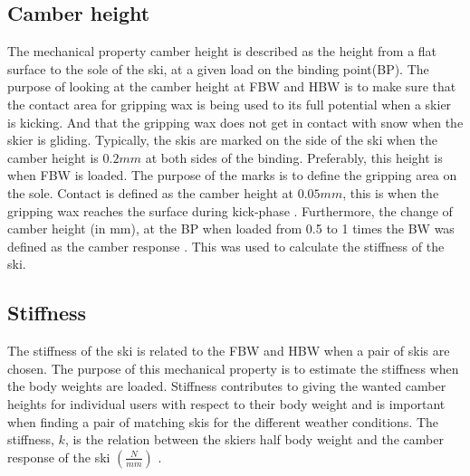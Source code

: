 \subsection{Camber height}
\label{subsec:camberheight}
The mechanical property camber height is described as the height from a flat surface to the sole of the ski, at a given load on the binding point(BP).
The purpose of looking at the camber height at FBW and HBW is to make sure that the contact area for gripping wax is being used to its full potential when a skier is kicking. And that the gripping wax does not get in contact with snow when the skier is gliding. Typically, the skis are marked on the side of the ski when the camber height is $0.2mm$ at both sides of the binding. Preferably, this height is when FBW is loaded. The purpose of the marks is to define the gripping area on the sole. Contact is defined as the camber height at $0.05mm$, this is when the gripping wax reaches the surface during kick-phase  \citep{breitschadel_variation_2012}. Furthermore, the change of camber height (in mm), at the BP when loaded from 0.5 to 1 times the BW was defined as the camber response \citep{breitschadel_technical_2014}. This was used to calculate the stiffness of the ski.

\subsection{Stiffness}
\label{subsec:stiffness}
The stiffness of the ski is related to the FBW and HBW when a pair of skis are chosen. The purpose of this mechanical property is to estimate the stiffness when the body weights are loaded. Stiffness contributes to giving the wanted camber heights for individual users with respect to their body weight and is important when finding a pair of matching skis for the different weather conditions. The stiffness, $k$, is the relation between the skiers half body weight and the camber response of the ski $(\frac{N}{mm})$ \citep{breitschadel_technical_2014}.

